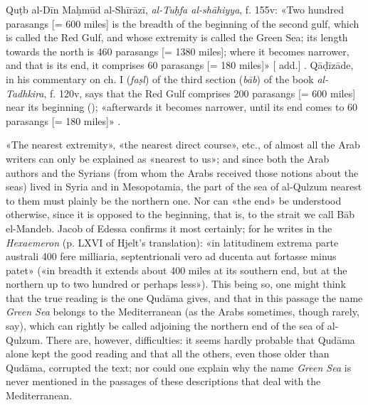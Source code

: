 \documentclass[11pt]{article}
\newcommand{\Pg}[1]{\marginpar{\footnotesize\color{gray}#1}}
\begin{document}
\par Quṭb al-Dīn Maḥmūd al-Shīrāzī, \emph{al-Tuḥfa al-shāhiyya}, f. 155v: «Two hundred parasangs [= 600 miles] is the breadth of the beginning of the second gulf, which is called the Red Gulf, and whose extremity is called the Green Sea; its length towards the north is 460 parasangs [= 1380 miles]; where it becomes narrower, and that is its end, it comprises 60 parasangs [= 180 miles]»  [ add.] . Qāḍīzāde, in his commentary on ch. I (\emph{faṣl}) of the third section (\emph{bāb}) of the book \emph{al-Tadhkira}, f. 120v, says that the Red Gulf comprises 200 parasangs [= 600 miles] near its beginning (); «afterwards it becomes narrower, until its end comes to 60 parasangs [= 180 miles]» .\par
\par \Pg{I 177}«The nearest extremity», «the nearest direct course», etc., of almost all the Arab writers can only be explained as «nearest to us»; and since both the Arab authors and the Syrians (from whom the Arabs received those notions about the seas) lived in Syria and in Mesopotamia, the part of the sea of al-Qulzum nearest to them must plainly be the northern one. Nor can «the end» be understood otherwise, since it is opposed to the beginning, that is, to the strait we call Bāb el-Mandeb. Jacob of Edessa confirms it most certainly; for he writes in the \emph{Hexaemeron} (p. LXVI of Hjelt's translation): «in latitudinem extrema parte australi 400 fere milliaria, septentrionali vero ad ducenta aut fortasse minus patet» («in breadth it extends about 400 miles at its southern end, but at the northern up to two hundred or perhaps less»). This being so, one might think that the true reading is the one Qudāma gives, and that in this passage the name \emph{Green Sea} belongs to the Mediterranean (as the Arabs sometimes, though rarely, say), which can rightly be called adjoining the northern end of the sea of al-Qulzum. There are, however, difficulties: it seems hardly probable that Qudāma alone kept the good reading and that all the others, even those older than Qudāma, corrupted the text; nor could one explain why the name \emph{Green Sea} is never mentioned in the passages of these descriptions that deal with the Mediterranean.\par
\end{document}
